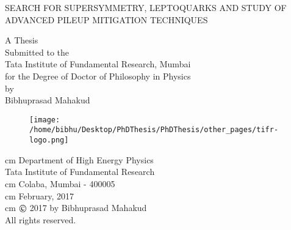 \thispagestyle{empty}
\begin{center}
{\Large SEARCH FOR SUPERSYMMETRY, LEPTOQUARKS AND STUDY OF ADVANCED PILEUP MITIGATION TECHNIQUES
}
\vskip 1.5cm %
{\large A Thesis \\
\vskip 0.01cm %
Submitted to the\\
\vskip 0.01cm
Tata Institute of Fundamental Research, Mumbai\\
\vskip 0.01cm
for the Degree of Doctor of Philosophy in Physics\\
\vskip 1.5cm
by\\
{\Large Bibhuprasad Mahakud}\\
\vskip 1.0cm
\begin{figure}[h]
\centering
\texttt{[image: /home/bibhu/Desktop/PhDThesis/PhDThesis/other\_pages/tifr-logo.png]}
\end{figure}
 cm
Department of High Energy Physics\\
Tata Institute of Fundamental Research \\
 cm
Colaba, Mumbai - 400005\\
 cm
February, 2017\\
 cm
{\small $\copyright$ 2017 by Bibhuprasad Mahakud\\ All rights reserved.}
}
\end{center}

